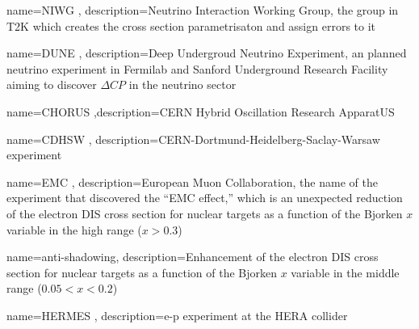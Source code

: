  {name=NIWG , description={Neutrino Interaction
Working Group, the group in T2K which creates the cross section
parametrisaton and assign errors to it}}

 {name=DUNE , description={Deep Undergroud
Neutrino Experiment, an planned neutrino experiment in Fermilab and
Sanford Underground Research Facility aiming to discover $\Delta CP$
in the neutrino sector}}

 {name=CHORUS ,description={CERN Hybrid
Oscillation Research ApparatUS}}

 {name=CDHSW ,
description={CERN-Dortmund-Heidelberg-Saclay-Warsaw experiment}}

 {name=EMC , description={European Muon
Collaboration, the name of the experiment that discovered the ``EMC
effect,'' which is an unexpected reduction of the electron DIS cross
section for nuclear targets as a function of the Bjorken $x$ variable
in the high range ($x > 0.3$)}}

 {name=anti-shadowing,
description={Enhancement of the electron DIS} cross section for
nuclear targets as a function of the Bjorken $x$ variable in the
middle range ($0.05<x<0.2$)}

 {name=HERMES , description={e-p experiment
at the HERA collider}}

